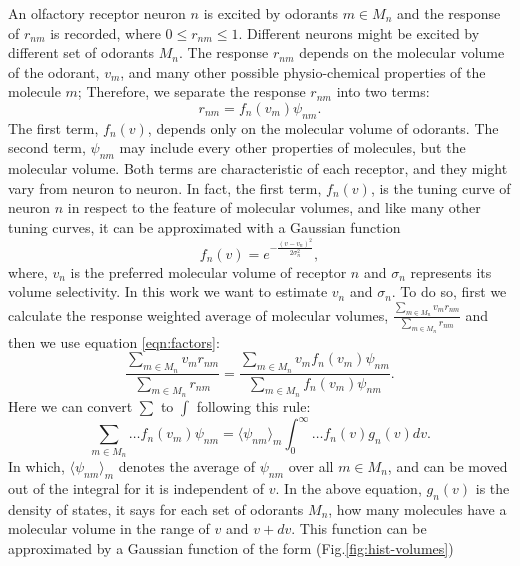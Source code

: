 \documentclass[11pt]{paper} %
\begin{document}
An olfactory receptor neuron $n$ is excited by odorants $m \in M_n$ and the response of $r_{nm}$ is recorded, 
where $0 \le r_{nm} \le 1$. 
Different neurons might be excited by different set of odorants $M_n$. 
The response $r_{nm}$ depends on the molecular volume of the odorant, $v_m$, 
and many other possible physio-chemical properties of the molecule $m$; 
Therefore, we separate the response $r_{nm}$ into two terms:
\begin{equation}
	r_{nm} = f_n(v_m) \psi_{nm}.
	\label{eqn:factors}
\end{equation}
The first term, $f_n(v)$, depends only on the molecular volume of odorants.
The second term, $\psi_{nm}$ may include every other properties of molecules, but the molecular volume.
Both terms are characteristic of each receptor, and they might vary from neuron to neuron.
In fact, the first term, $f_n(v)$, is the tuning curve of neuron $n$ in respect to the feature of molecular volumes, 
and like many other tuning curves, it can be approximated with a Gaussian function
\begin{equation}
	\displaystyle f_n(v) = e^{-\frac{(v-v_n)^2}{2\sigma^2_n}}, 
	\label{eqn:volume-dependence}
\end{equation}
where, $v_n$ is the preferred molecular volume of receptor $n$ and $\sigma_n$ represents its volume selectivity. 
In this work we want to estimate $v_n$ and $\sigma_n$. 
To do so, first we calculate the response weighted average of molecular volumes, 
$\frac{\sum_{m\in M_n} v_m r_{nm}}{\sum_{m\in M_n} r_{nm}}$ and then we use equation \ref{eqn:factors}:
\begin{equation}
	\frac{\displaystyle \sum_{m\in M_n} v_m r_{nm}}{\displaystyle \sum_{m\in M_n} r_{nm}} = \frac{\displaystyle \sum_{m\in M_n} v_m f_n(v_m) \psi_{nm}}{\displaystyle \sum_{m\in M_n} f_n(v_m) \psi_{nm}}.
	\label{eqn:sta}
\end{equation}
Here we can convert $\sum$ to $\int$ following this rule:
\begin{equation}
	\sum_{m\in M_n} \dots f_n(v_m) \psi_{nm} =  \langle \psi_{nm} \rangle_m \int_0^\infty \dots f_n(v) g_n(v)  dv. 
	\label{eqn:sigma_to_int}
\end{equation}
In which, 
$\langle \psi_{nm} \rangle_m$ denotes the average of $\psi_{nm}$ over all $m \in M_n$, 
and can be moved out of the integral for it is independent of $v$.
In the above equation, 
$g_n(v)$ is the density of states, it says for each set of odorants $M_n$, how many molecules have a molecular volume in the range of $v$ and $v+dv$.
This function can be approximated by a Gaussian function of the form (Fig.\ref{fig:hist-volumes})
\end{document}
